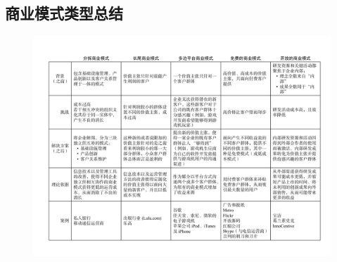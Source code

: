     \subsection{商业模式类型总结}
    \begin{figure}[H]
		\centering
        \vspace{-0.5em}
		\includegraphics[width=\textwidth]{img/商业模式总结.pdf}
        \vspace{-0.5em}
	\end{figure}

















